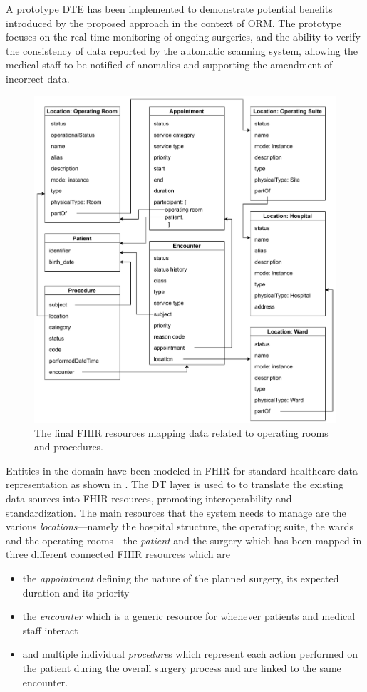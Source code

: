 A prototype \ac{DTE} has been implemented to demonstrate potential benefits introduced by the proposed approach in the context of ORM.
%
The prototype focuses on the real-time monitoring of ongoing surgeries, and the ability to verify the consistency of data reported by the automatic scanning system, allowing the medical staff to be notified of anomalies and supporting the amendment of incorrect data. 

\begin{figure}
    \centering
    \includegraphics[width=\textwidth]{figures/orm/FHIR_mapping.pdf}
    \caption{The final FHIR resources mapping data related to operating rooms and procedures.}
    \label{fig:orm:fhir_mapping}
\end{figure}

Entities in the domain have been modeled in FHIR for standard healthcare data representation as shown in .
%
The \ac{DT} layer is used to to translate the existing data sources into FHIR resources, promoting interoperability and standardization.
%
The main resources that the system needs to manage are the various \textit{locations}---namely the hospital structure, the operating suite, the wards and the operating rooms---the \textit{patient} and the surgery which has been mapped in three different connected FHIR resources which are
\begin{itemize} 
    \item the \textit{appointment} defining the nature of the planned surgery, its expected duration and its priority
    \item the \textit{encounter} which is a generic resource for whenever patients and medical staff interact 
    \item and multiple individual \textit{procedure}s which represent each action performed on the patient during the overall surgery process and are linked to the same encounter.
\end{itemize}

